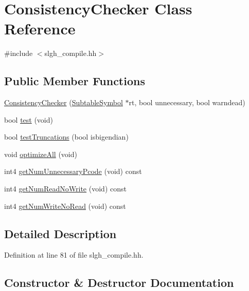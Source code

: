 \hypertarget{class_consistency_checker}{}\section{Consistency\+Checker Class Reference}
\label{class_consistency_checker}


{\ttfamily \#include $<$slgh\+\_\+compile.\+hh$>$}

\subsection*{Public Member Functions}
\begin{DoxyCompactItemize}
\item 
\mbox{\hyperlink{class_consistency_checker_a7702bbb48f8a33eac4f97368ceea6ac7}{Consistency\+Checker}} (\mbox{\hyperlink{class_subtable_symbol}{Subtable\+Symbol}} $\ast$rt, bool unnecessary, bool warndead)
\item 
bool \mbox{\hyperlink{class_consistency_checker_a57b5de34417bedf2a556027f51656449}{test}} (void)
\item 
bool \mbox{\hyperlink{class_consistency_checker_a0002274529b2524ceae6c2ddfcdf31eb}{test\+Truncations}} (bool isbigendian)
\item 
void \mbox{\hyperlink{class_consistency_checker_a8baa2abf8f67bb15d60e7ad3f2c28f52}{optimize\+All}} (void)
\item 
int4 \mbox{\hyperlink{class_consistency_checker_a22a41dd2a5e0787ac280d20528b4a9ef}{get\+Num\+Unnecessary\+Pcode}} (void) const
\item 
int4 \mbox{\hyperlink{class_consistency_checker_a45582b954c8fe61cf81e7c848a03dc4b}{get\+Num\+Read\+No\+Write}} (void) const
\item 
int4 \mbox{\hyperlink{class_consistency_checker_a340ac3876e27c5bdc0d0aecef6140c67}{get\+Num\+Write\+No\+Read}} (void) const
\end{DoxyCompactItemize}


\subsection{Detailed Description}


Definition at line 81 of file slgh\+\_\+compile.\+hh.



\subsection{Constructor \& Destructor Documentation}
\mbox{\label{class_consistency_checker_a7702bbb48f8a33eac4f97368ceea6ac7}} 
